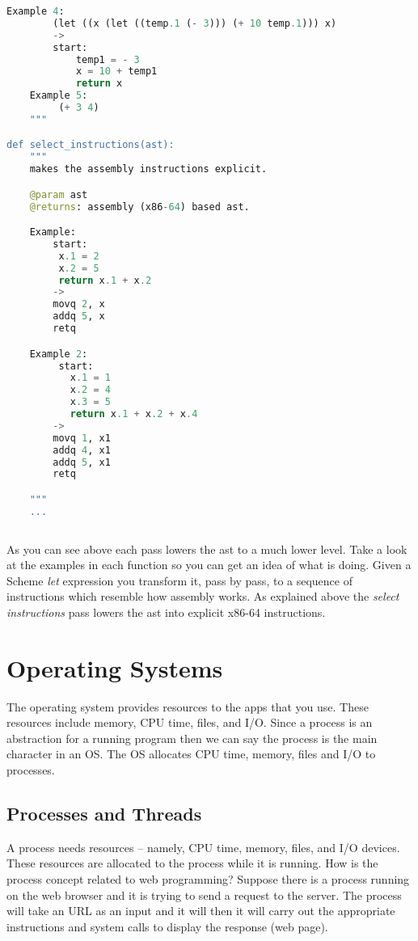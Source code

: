 \documentclass{amsbook}
\begin{document}
\begin{lstlisting}[language=python]
    Example 4:
        (let ((x (let ((temp.1 (- 3))) (+ 10 temp.1))) x)
        ->
        start:
            temp1 = - 3
            x = 10 + temp1
            return x
    Example 5:
         (+ 3 4)
    """

def select_instructions(ast):
    """
    makes the assembly instructions explicit.

    @param ast
    @returns: assembly (x86-64) based ast.

    Example:
        start:
         x.1 = 2
         x.2 = 5
         return x.1 + x.2
        ->
        movq 2, x
        addq 5, x
        retq

    Example 2:
         start:
           x.1 = 1
           x.2 = 4
           x.3 = 5
           return x.1 + x.2 + x.4
        ->
        movq 1, x1
        addq 4, x1
        addq 5, x1
        retq

    """
    ...
    
\end{lstlisting}

As you can see above each pass lowers the ast to a much lower level. Take a look at the examples in each function so you can get an idea of what is doing. Given a Scheme \textit{let} expression you transform it, pass by pass, to a sequence of instructions which resemble how assembly works. As explained above the \textit{select instructions} pass lowers the ast into explicit x86-64 instructions.

\chapter{Operating Systems}
The operating system provides resources to the apps that you use. These resources include memory, CPU time, files, and I/O. Since a process is an abstraction for a running program then we can say the process is the main character in an OS. The OS allocates CPU time, memory, files and I/O to processes.

\section{Processes and Threads}

A process needs resources -- namely, CPU time, memory, files, and I/O devices. These resources are allocated to the process while it is running. How is the process concept related to web programming? Suppose there is a process running on the web browser and it is trying to send a request to the server. The process will take an URL as an input and it will then it will carry out the appropriate instructions and system calls to display the response (web page).
\end{document}
